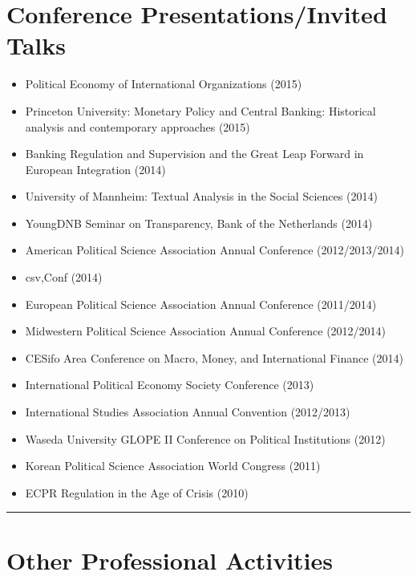 \documentclass[a4paper]{article}
\begin{document}
{{\section*{Conference Presentations/Invited Talks}

\begin{itemize}
    \item Political Economy of International Organizations (2015)
    \item Princeton University: Monetary Policy and Central Banking: Historical analysis and contemporary approaches (2015)
    \item Banking Regulation and Supervision and the Great Leap Forward in European Integration (2014)
    \item University of Mannheim: Textual Analysis in the Social Sciences (2014)
    \item YoungDNB Seminar on Transparency, Bank of the Netherlands (2014)
    \item American Political Science Association Annual Conference (2012/2013/2014)
    \item csv,Conf (2014)
    \item European Political Science Association Annual Conference (2011/2014)
    \item Midwestern Political Science Association Annual Conference (2012/2014)
    \item CESifo Area Conference on Macro, Money, and International Finance (2014)
    \item International Political Economy Society Conference (2013)
    \item International Studies Association Annual Convention (2012/2013)
    \item Waseda University GLOPE II Conference on Political Institutions (2012)
    \item Korean Political Science Association World Congress (2011)
    \item ECPR Regulation in the Age of Crisis (2010)
\end{itemize}


\vspace{0.25cm}
\medskip\hrule height 1pt
\vspace{0.5cm}

\section*{Other Professional Activities}

}}
\end{document}
